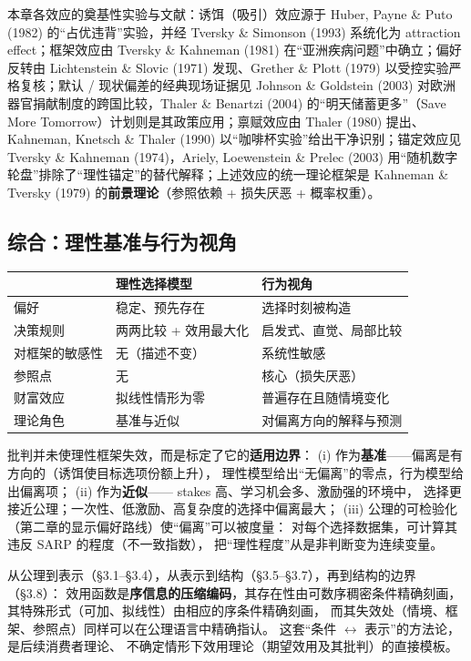\begin{remark}[文献线索]
本章各效应的奠基性实验与文献：诱饵（吸引）效应源于 Huber, Payne \& Puto (1982) 的“占优违背”实验，并经 Tversky \& Simonson (1993) 系统化为 attraction effect；框架效应由 Tversky \& Kahneman (1981) 在“亚洲疾病问题”中确立；偏好反转由 Lichtenstein \& Slovic (1971) 发现、Grether \& Plott (1979) 以受控实验严格复核；默认 / 现状偏差的经典现场证据见 Johnson \& Goldstein (2003) 对欧洲器官捐献制度的跨国比较，Thaler \& Benartzi (2004) 的“明天储蓄更多”（Save More Tomorrow）计划则是其政策应用；禀赋效应由 Thaler (1980) 提出、Kahneman, Knetsch \& Thaler (1990) 以“咖啡杯实验”给出干净识别；锚定效应见 Tversky \& Kahneman (1974)，Ariely, Loewenstein \& Prelec (2003) 用“随机数字轮盘”排除了“理性锚定”的替代解释；上述效应的统一理论框架是 Kahneman \& Tversky (1979) 的\textbf{前景理论}（参照依赖 + 损失厌恶 + 概率权重）。
\end{remark}

\subsection{综合：理性基准与行为视角}

\begin{center}
\small
\begin{tabular}{lll}
\toprule
 & 理性选择模型 & 行为视角 \\
\midrule
偏好 & 稳定、预先存在 & 选择时刻被构造 \\
决策规则 & 两两比较 + 效用最大化 & 启发式、直觉、局部比较 \\
对框架的敏感性 & 无（描述不变） & 系统性敏感 \\
参照点 & 无 & 核心（损失厌恶） \\
财富效应 & 拟线性情形为零 & 普遍存在且随情境变化 \\
理论角色 & 基准与近似 & 对偏离方向的解释与预测 \\
\bottomrule
\end{tabular}
\end{center}

\begin{remark}[如何对待批判]
批判并未使理性框架失效，而是标定了它的\textbf{适用边界}：
(i) 作为\textbf{基准}——偏离是有方向的（诱饵使目标选项份额上升），
理性模型给出“无偏离”的零点，行为模型给出偏离项；
(ii) 作为\textbf{近似}—— stakes 高、学习机会多、激励强的环境中，
选择更接近公理；一次性、低激励、高复杂度的选择中偏离最大；
(iii) 公理的可检验化（第二章的显示偏好路线）使“偏离”可以被度量：
对每个选择数据集，可计算其违反 SARP 的程度（不一致指数），
把“理性程度”从是非判断变为连续变量。
\end{remark}

\begin{remark}[本章收束]
从公理到表示（§3.1--§3.4），从表示到结构（§3.5--§3.7），再到结构的边界（§3.8）：
效用函数是\textbf{序信息的压缩编码}，其存在性由可数序稠密条件精确刻画，
其特殊形式（可加、拟线性）由相应的序条件精确刻画，
而其失效处（情境、框架、参照点）同样可以在公理语言中精确指认。
这套“条件 $\leftrightarrow$ 表示”的方法论，是后续消费者理论、
不确定情形下效用理论（期望效用及其批判）的直接模板。
\end{remark}
